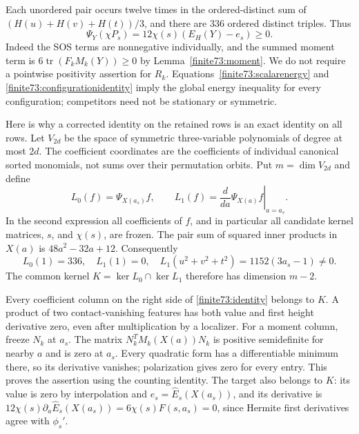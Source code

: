 \documentclass[12pt,reqno]{amsart}
\theoremstyle{definition}
\newcommand{\Eh}{\widehat E}
\numberwithin{equation}{section}
\begin{document}
Each unordered pair occurs twelve times in the ordered-distinct sum of $(H(u)+H(v)+H(t))/3$, and there are $336$ ordered distinct triples. Thus
\begin{equation}\label{finite73:configurationidentity}
 \Psi_Y(\chi P_s)=12\chi(s)(E_H(Y)-e_s)\geq0.
\end{equation}
Indeed the SOS terms are nonnegative individually, and the summed moment term is $6\operatorname{tr}(F_kM_k(Y))\geq0$ by Lemma~\ref{finite73:moment}. We do not require a pointwise positivity assertion for $R_k$. Equations~\eqref{finite73:scalarenergy} and \eqref{finite73:configurationidentity} imply the global energy inequality for every configuration; competitors need not be stationary or symmetric.

Here is why a corrected identity on the retained rows is an exact identity on all rows. Let $V_{2d}$ be the space of symmetric three-variable polynomials of degree at most $2d$. The coefficient coordinates are the coefficients of individual canonical sorted monomials, not sums over their permutation orbits. Put $m=\dim V_{2d}$ and define
\begin{equation}\label{finite73:annihilators}
 L_0(f)=\Psi_{X(a_s)}f,\qquad
 L_1(f)=\left.\frac{d}{da}\Psi_{X(a)}f\right|_{a=a_s}.
\end{equation}
In the second expression all coefficients of $f$, and in particular all candidate kernel matrices, $s$, and $\chi(s)$, are frozen. The pair sum of squared inner products in $X(a)$ is $48a^2-32a+12$. Consequently
\begin{equation}\label{finite73:annihilatorindependence}
 L_0(1)=336,\quad L_1(1)=0,\quad
 L_1(u^2+v^2+t^2)=1152(3a_s-1)\ne0.
\end{equation}
The common kernel $K=\ker L_0\cap\ker L_1$ therefore has dimension $m-2$.

Every coefficient column on the right side of \eqref{finite73:identity} belongs to $K$. A product of two contact-vanishing features has both value and first height derivative zero, even after multiplication by a localizer. For a moment column, freeze $N_k$ at $a_s$. The matrix $N_k^TM_k(X(a))N_k$ is positive semidefinite for nearby $a$ and is zero at $a_s$. Every quadratic form has a differentiable minimum there, so its derivative vanishes; polarization gives zero for every entry. This proves the assertion using the counting identity. The target also belongs to $K$: its value is zero by interpolation and $e_s=\Eh_s(X(a_s))$, and its derivative is $12\chi(s)\partial_a\widehat E_s(X(a_s))=6\chi(s)F(s,a_s)=0$, since Hermite first derivatives agree with $\phi_s'$.
\end{document}
